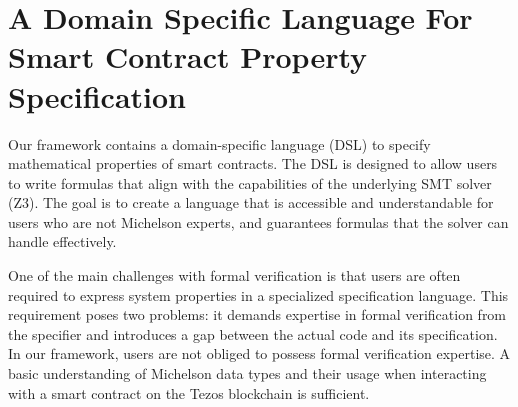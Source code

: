 \documentclass[a4paper,USenglish,cleveref, autoref, thm-restate]{lipics-v2021}
\begin{document}
\section {A Domain Specific Language For Smart Contract Property Specification}
\label{sec:domain-specific-language}

Our framework contains a domain-specific language (DSL) to specify
mathematical properties of smart contracts.
The DSL is designed to allow users to write formulas that align with
the capabilities of the underlying SMT solver (Z3).
The goal is to create a language
that is accessible and understandable for users who are
not Michelson experts, and guarantees formulas that the solver can handle effectively.



One of the main challenges with formal verification is that users are
often required to express  system properties in a specialized
specification language. This requirement poses two problems: it
demands expertise in formal verification from the specifier and
introduces a gap between the actual code and its specification. In our
framework, users are not obliged to possess formal verification
expertise. A basic understanding of Michelson data types and their
usage when interacting with a smart contract on the Tezos blockchain
is sufficient.
\end{document}
